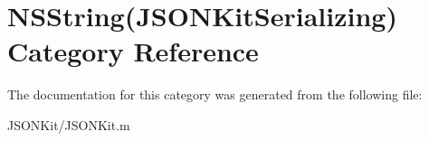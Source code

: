 \hypertarget{category_n_s_string_07_j_s_o_n_kit_serializing_08}{\section{N\+S\+String(J\+S\+O\+N\+Kit\+Serializing) Category Reference}
\label{category_n_s_string_07_j_s_o_n_kit_serializing_08}
}


The documentation for this category was generated from the following file\+:\begin{DoxyCompactItemize}
\item 
J\+S\+O\+N\+Kit/J\+S\+O\+N\+Kit.\+m\end{DoxyCompactItemize}
